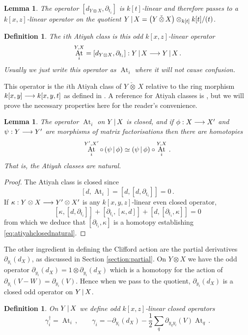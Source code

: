 \documentclass[english,letter paper,12pt,leqno]{article}
\newtheorem{lemma}[theorem]{Lemma}
\theoremstyle{example}
\newtheorem{definition}[theorem]{Definition}
\numberwithin{equation}{section}
\def\be{\begin{equation}}
\def\ee{\end{equation}}
\DeclareMathOperator{\At}{At}
\begin{document}
\begin{lemma} The operator $[ d_{Y \otimes X}, \partial_{t_i} ]$ is $k[t]$-linear and therefore passes to a $k[x,z]$-linear operator on the quotient $Y \,|\, X = \left( Y \, \check{\otimes}\, X \right) \otimes_{k[t]} k[t]/(t)$.
\end{lemma}



\begin{definition} The $i$th Atiyah class is this odd $k[x,z]$-linear operator
\[
\At^{Y,X}_i = [d_{Y \otimes X}, \partial_{t_i}]: Y \l X \lto Y \l X \,.
\]
Usually we just write this operator as $\At_i$ where it will not cause confusion.
\end{definition}

This operator is the $i$th Atiyah class of $Y \,\check{\otimes}\, X$ relative to the ring morphism $k[x,y] \longrightarrow k[x,y,t]$ as defined in \cite[Section 9]{dm1102.2957}. A reference for Atiyah classes is \cite{buchweitz_flenner}, but we will prove the necessary properties here for the reader's convenience.

\begin{lemma}\label{lemma:atiyahclosed} The operator $\At_i$ on $Y \,|\, X$ is closed, and if $\phi: X \longrightarrow X'$ and $\psi: Y \longrightarrow Y'$ are morphisms of matrix factorisations then there are homotopies
\be\label{eq:atiyahclosednatural}
\At^{Y',X'}_i \circ \,( \psi \l \phi ) \simeq ( \psi \l \phi ) \circ \At^{Y,X}_i\,.
\ee
That is, the Atiyah classes are \emph{natural}.
\end{lemma}
\begin{proof}
The Atiyah class is closed since
\[
[d, \At_i] = [d, [d, \partial_{t_i}]] = 0\,.
\]
If $\kappa: Y \otimes X \longrightarrow Y' \otimes X'$ is any $k[x,y,z]$-linear even closed operator, 
\[
[ \kappa, [ d, \partial_{t_i} ] ] + [ \partial_{t_i}, [\kappa, d]] + [ d, [ \partial_{t_i}, \kappa] ] = 0
\]
from which we deduce that $[\partial_{t_i}, \kappa]$ is a homotopy establishing \eqref{eq:atiyahclosednatural}.
\end{proof}

The other ingredient in defining the Clifford action are the partial derivatives $\partial_{y_i}(d_X)$, as discussed in Section \ref{section:partial}. On $Y \otimes X$ we have the odd operator $\partial_{y_i}(d_X) = 1 \otimes \partial_{y_i}(d_X)$ which is a homotopy for the action of $\partial_{y_i}(V - W) = \partial_{y_i}(V)$. Hence when we pass to the quotient, $\partial_{y_i}(d_X)$ is a closed odd operator on $Y \,|\, X$.

\begin{definition}\label{defn:cliffordaction_cut} On $Y \,|\, X$ we define odd $k[x,z]$-linear closed operators
\begin{equation}\label{eq:intro_clifford_act1}
\gamma_i^\dagger = \At_i\,, \qquad \gamma_i = - \partial_{y_i}(d_X) - \frac{1}{2} \sum_q \partial_{y_q y_i}(V) \At_{q}\,.
\end{equation}
\end{definition}
\end{document}
